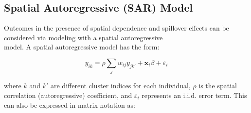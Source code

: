 \documentclass{article}[11pt]
\begin{document}




\subsection{Spatial Autoregressive (SAR) Model}\label{section:SAR}

Outcomes in the presence of spatial dependence and spillover effects can be considered via modeling with a spatial autoregressive\\ model\cite{waller_applied_2004}\cite{fotheringham_sage_2009}\cite{ullah_handbook_1998}. A spatial autoregressive model has the form:

\begin{equation}\label{Equation:SARmodel}
    y_{ik} = \rho\sum_j w_{ij}y_{jk'} + \mathbf{x}_i \beta + \varepsilon_i
\end{equation}

\noindent where $k$ and $k'$ are different cluster indices for each individual, $\rho$ is the spatial correlation (autoregressive) coefficient, and $\varepsilon_i$ represents an i.i.d. error term. This can also be expressed in matrix notation as:
\end{document}
